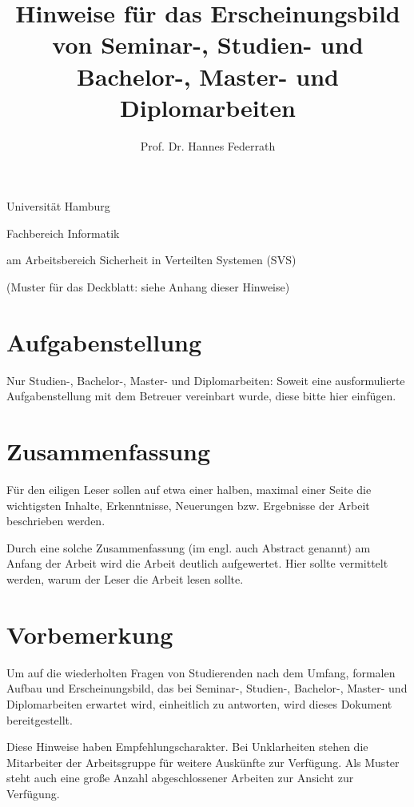 \documentclass[
    12pt,
    headings=small,
    parskip=half,           %
    bibliography=totoc,
    numbers=noenddot,       %
    open=any,               %
    ]{scrreprt}
\title{Hinweise für das Erscheinungsbild von Seminar-, Studien- und Bachelor-,
    Master- und Diplomarbeiten}
\author{Prof. Dr. Hannes Federrath}
\begin{document}
\begin{titlepage}
\begin{center}\Large
    Universität Hamburg \par
    Fachbereich Informatik
    \vfill
    \makeatletter
    {\Large\textsf{\textbf{\@title}}\par}
    \makeatother
    \bigskip
    am Arbeitsbereich Sicherheit in Verteilten Systemen (SVS) \par
    \bigskip
    \makeatletter
    {\@author} \par
    \makeatother
    \bigskip
    \makeatletter
    {\@date}
    \makeatother
    \vfill
    \vfill
    (Muster für das Deckblatt: siehe Anhang dieser Hinweise)
\end{center}
\end{titlepage}


\chapter*{Aufgabenstellung}

Nur Studien-, Bachelor-, Master- und Diplomarbeiten: Soweit eine ausformulierte Aufgabenstellung mit dem Betreuer vereinbart wurde, diese bitte hier einfügen.

\chapter*{Zusammenfassung}

Für den eiligen Leser sollen auf etwa einer halben, maximal einer Seite die wichtigsten Inhalte, Erkenntnisse, Neuerungen bzw. Ergebnisse der Arbeit beschrieben werden.

Durch eine solche Zusammenfassung (im engl. auch Abstract genannt) am Anfang der Arbeit wird die Arbeit deutlich aufgewertet. Hier sollte vermittelt werden, warum der Leser die Arbeit lesen sollte.

\tableofcontents

\chapter{Vorbemerkung}

Um auf die wiederholten Fragen von Studierenden nach dem Umfang, formalen Aufbau und Erscheinungsbild, das bei Seminar-, Studien-, Bachelor-, Master- und Diplomarbeiten erwartet wird, einheitlich zu antworten, wird dieses Dokument bereitgestellt.

Diese Hinweise haben Empfehlungscharakter. Bei Unklarheiten stehen die Mitarbeiter der Arbeitsgruppe für weitere Auskünfte zur Verfügung. Als Muster steht auch eine große Anzahl abgeschlossener Arbeiten zur Ansicht zur Verfügung.
\end{document}
